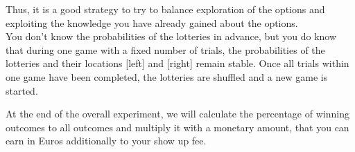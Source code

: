 \documentclass[12pt, oneside]{scrartcl}
\begin{document}
Thus, it is a good strategy to try to balance exploration of the options and exploiting the knowledge you have already gained about the options. \\

You don’t know the probabilities of the lotteries in advance, but you do know that during one game with a fixed number of trials, the probabilities of the lotteries and their locations [left] and [right] remain stable. Once all trials within one game have been completed, the lotteries are shuffled and a new game is started.

At the end of the overall experiment, we will calculate the percentage of winning outcomes to all outcomes and multiply it with a monetary amount, that you can earn in Euros additionally to your show up fee.


\pagebreak
\end{document}
